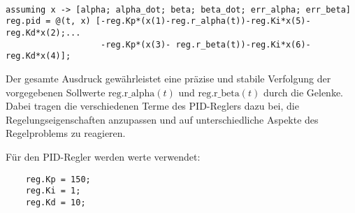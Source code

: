 \begin{verbatim}

assuming x -> [alpha; alpha_dot; beta; beta_dot; err_alpha; err_beta]
reg.pid = @(t, x) [-reg.Kp*(x(1)-reg.r_alpha(t))-reg.Ki*x(5)-reg.Kd*x(2);...
                   -reg.Kp*(x(3)- reg.r_beta(t))-reg.Ki*x(6)-reg.Kd*x(4)];
\end{verbatim}


Der gesamte Ausdruck gewährleistet eine präzise und stabile Verfolgung der vorgegebenen Sollwerte \( \text{reg.r\_alpha}(t) \) und \( \text{reg.r\_beta}(t) \) durch die Gelenke. Dabei tragen die verschiedenen Terme des PID-Reglers dazu bei, die Regelungseigenschaften anzupassen und auf unterschiedliche Aspekte des Regelproblems zu reagieren.

Für den PID-Regler werden werte verwendet:
\begin{verbatim}
    reg.Kp = 150;
    reg.Ki = 1;
    reg.Kd = 10;
\end{verbatim}